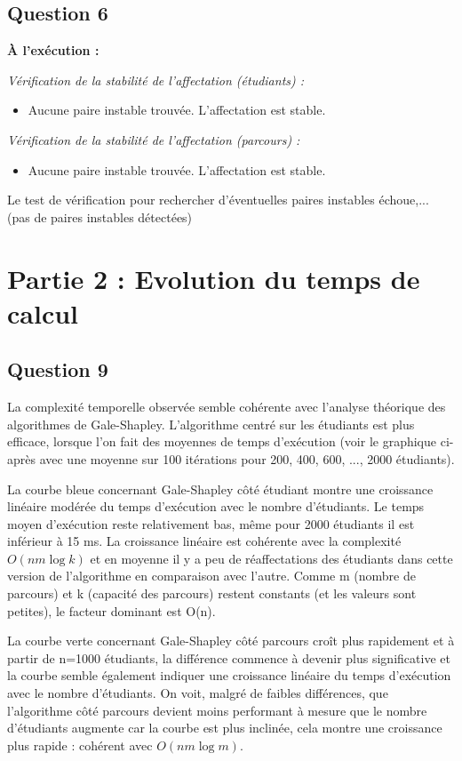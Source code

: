 \documentclass[a4paper,11pt]{article}
\begin{document}
\subsection*{Question 6}

\textbf{À l'exécution :}

\textit{Vérification de la stabilité de l'affectation (étudiants) :}
\begin{itemize}[label=\textbullet]
\item Aucune paire instable trouvée. L'affectation est stable.
\end{itemize}

\textit{Vérification de la stabilité de l'affectation (parcours) :}
\begin{itemize}[label=\textbullet]
\item Aucune paire instable trouvée. L'affectation est stable.
\end{itemize}

Le test de vérification pour rechercher d'éventuelles paires instables échoue,... (pas de paires instables détectées)


\section*{Partie 2 : Evolution du temps de calcul}

\subsection*{Question 9}

La complexité temporelle observée semble cohérente avec l'analyse théorique des algorithmes de Gale-Shapley. L'algorithme centré sur les étudiants est plus efficace, lorsque l'on fait des moyennes de temps d'exécution (voir le graphique ci-après avec une moyenne sur 100 itérations pour 200, 400, 600, ..., 2000 étudiants).

La courbe bleue concernant Gale-Shapley côté étudiant montre une croissance linéaire modérée du temps d'exécution avec le nombre d'étudiants. Le temps moyen d'exécution reste relativement bas, même pour 2000 étudiants il est inférieur à 15 ms.
La croissance linéaire est cohérente avec la complexité $O(nm \log k)$ et en moyenne il y a peu de réaffectations des étudiants dans cette version de l'algorithme en comparaison avec l'autre. Comme m (nombre de parcours) et k (capacité des parcours) restent constants (et les valeurs sont petites), le facteur dominant est O(n).

La courbe verte concernant Gale-Shapley côté parcours croît plus rapidement et à partir de n=1000 étudiants, la différence commence à devenir plus significative et la courbe semble également indiquer une croissance linéaire du temps d'exécution avec le nombre d'étudiants. On voit, malgré de faibles différences, que l'algorithme côté parcours devient moins performant à mesure que le nombre d'étudiants augmente car la courbe est plus inclinée, cela montre une croissance plus rapide : cohérent avec $O(nm \log m)$.
\end{document}
